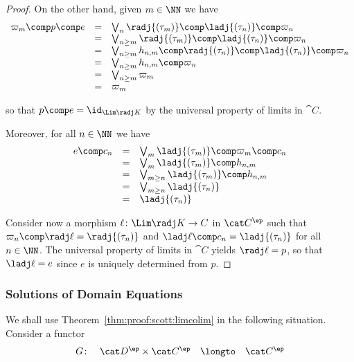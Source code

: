 \begin{proof}
\noindent
On the other hand, given $m \in \NN$ we have
\[
\begin{array}{l l l}
  \varpi_m \comp p \comp e
& =
& \bigvee_{n} \radj{(\tau_m)} \comp \ladj{(\tau_n)} \comp \varpi_n
\\
%
& =
& \bigvee_{n \geq m} \radj{(\tau_m)} \comp \ladj{(\tau_n)} \comp \varpi_n
\\
%
& =
& \bigvee_{n \geq m} h_{n,m} \comp \radj{(\tau_n)} \comp \ladj{(\tau_n)} \comp \varpi_n
\\
%
& =
& \bigvee_{n \geq m} h_{n,m} \comp \varpi_n
\\
%
& =
& \bigvee_{n \geq m} \varpi_m
\\
%
& =
& \varpi_m
\end{array}
\]

\noindent
so that $p \comp e = \id_{\Lim \radj K}$
by the universal property of limits in $\cat C$.

Moreover, for all $n \in \NN$ we have
\[
\begin{array}{l l l}
  e \comp c_n
& =
& \bigvee_m \ladj{(\tau_m)} \comp \varpi_m \comp c_n
\\
%
& =
& \bigvee_m \ladj{(\tau_m)} \comp h_{n,m}
\\
%
& =
& \bigvee_{m\geq n} \ladj{(\tau_m)} \comp h_{n,m}
\\
%
& =
& \bigvee_{m\geq n} \ladj{(\tau_n)}
\\
%
& =
& \ladj{(\tau_n)}
\end{array}
\]

Consider now a morphism $\ell \colon \Lim \radj K \to C$
in $\cat C^\ep$
such that 
$\varpi_n \comp \radj\ell = \radj{(\tau_n)}$
and
$\ladj\ell \comp c_n = \ladj{(\tau_n)}$
for all $n \in \NN$.
The universal property of limits in $\cat C$
yields $\radj\ell = p$, so that $\ladj\ell = e$
since $e$ is uniquely determined from $p$.
\end{proof}


\subsubsection{Solutions of Domain Equations}
We shall use Theorem~\ref{thm:proof:scott:limcolim}
in the following situation.
Consider a functor
\[
\begin{array}{*{4}{l}}
  G \colon
& \cat D^\ep \times \cat C^\ep
& \longto
& \cat C^\ep
\end{array}
\]

